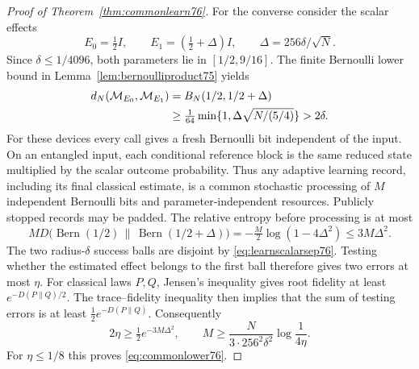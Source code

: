 \begin{proof}[Proof of Theorem~\ref{thm:commonlearn76}]
For the converse consider the scalar effects
\begin{equation}\label{eq:learnscalarpair76}
 E_0=\tfrac12I,
 \qquad E_1=(\tfrac12+\Delta)I,
 \qquad \Delta=256\delta/\sqrt N.
\end{equation}
Since $\delta\le1/4096$, both parameters lie in $[1/2,9/16]$.
The finite Bernoulli lower bound in
Lemma~\ref{lem:bernoulliproduct75} yields
\begin{align}
 d_N(\mathcal M_{E_0},\mathcal M_{E_1})
 &=B_N(1/2,1/2+\Delta)\notag\\
 &\ge\tfrac1{64}
       \min\{1,\Delta\sqrt{N/(5/4)}\}>2\delta.
                                      \label{eq:learnscalarsep76}
\end{align}
For these devices every call gives a fresh Bernoulli bit independent
of the input.  On an entangled input, each conditional reference
block is the same reduced state multiplied by the scalar outcome
probability.  Thus any adaptive learning record, including its
final classical estimate, is a common stochastic processing of
$M$ independent Bernoulli bits and parameter-independent resources.
Publicly stopped records may be padded.  The relative entropy before
processing is at most
\begin{equation}\label{eq:learnscalarkl76}
 M D\bigl(\operatorname{Bern}(1/2)\,\|\,
                \operatorname{Bern}(1/2+\Delta)\bigr)
   =-\tfrac M2\log(1-4\Delta^2)
   \le3M\Delta^2.
\end{equation}
The two radius-$\delta$ success balls are disjoint by
\eqref{eq:learnscalarsep76}.  Testing whether the estimated effect
belongs to the first ball therefore gives two errors at most $\eta$.
For classical laws $P,Q$, Jensen's inequality gives root fidelity
at least $e^{-D(P\|Q)/2}$.  The trace--fidelity inequality then
implies that the sum of testing errors is at least
$\tfrac12e^{-D(P\|Q)}$.  Consequently
\[
 2\eta\ge\tfrac12e^{-3M\Delta^2},
 \qquad
 M\ge\frac{N}{3\cdot256^2\delta^2}
                    \log\frac1{4\eta}.
\]
For $\eta\le1/8$ this proves \eqref{eq:commonlower76}.
\end{proof}

